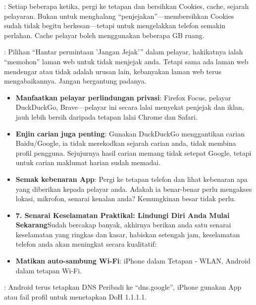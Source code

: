 : Setiap beberapa ketika, pergi ke tetapan dan bersihkan Cookies, cache, sejarah pelayaran. Bukan untuk menghalang “penjejakan”—membersihkan Cookies sudah tidak begitu berkesan—tetapi untuk mengelakkan telefon semakin perlahan. Cache pelayar boleh menggunakan beberapa GB ruang.


: Pilihan “Hantar permintaan 'Jangan Jejak'” dalam pelayar, hakikatnya ialah “memohon” laman web untuk tidak menjejak anda. Tetapi sama ada laman web mendengar atau tidak adalah urusan lain, kebanyakan laman web terus mengabaikannya. Jangan bergantung padanya.

\begin{itemize}
  \item \textbf{Manfaatkan pelayar perlindungan privasi}: Firefox Focus, pelayar DuckDuckGo, Brave—pelayar ini secara lalai menyekat penjejak dan iklan, jauh lebih bersih daripada tetapan lalai Chrome dan Safari.
  \item \textbf{Enjin carian juga penting}: Gunakan DuckDuckGo menggantikan carian Baidu/Google, ia tidak merekodkan sejarah carian anda, tidak membina profil pengguna. Sejujurnya hasil carian memang tidak setepat Google, tetapi untuk carian maklumat harian sudah memadai.
  \item \textbf{Semak kebenaran App}: Pergi ke tetapan telefon dan lihat kebenaran apa yang diberikan kepada pelayar anda. Adakah ia benar-benar perlu mengakses lokasi, mikrofon, senarai kenalan anda? Kemungkinan besar tidak perlu.
  \item \textbf{7. Senarai Keselamatan Praktikal: Lindungi Diri Anda Mulai Sekarang}Sudah bercakap banyak, akhirnya berikan anda satu senarai keselamatan yang ringkas dan kasar, habiskan setengah jam, keselamatan telefon anda akan meningkat secara kualitatif:
  \item \textbf{Matikan auto-sambung Wi-Fi}: iPhone dalam Tetapan - WLAN, Android dalam tetapan Wi-Fi.
\end{itemize}


: Android terus tetapkan DNS Peribadi ke “dns.google”, iPhone gunakan App atau fail profil untuk menetapkan DoH 1.1.1.1.

